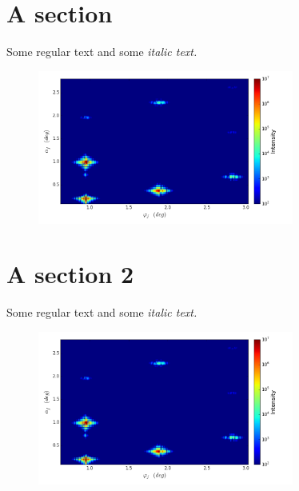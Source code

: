 \documentclass[landscape]{article}%
\begin{document}
%
\normalsize%
\section{A section}%
\label{sec:A section}%
Some regular text and some %
\textit{italic text. }%


\begin{figure}[h!]%
\centering%
\includegraphics[width=0.75\textwidth]{meso.png}%
\end{figure}

%
\newpage%
\section{A section 2}%
\label{sec:A section 2}%
Some regular text and some %
\textit{italic text. }%


\begin{figure}[h!]%
\centering%
\includegraphics[width=0.75\textwidth]{meso.png}%
\end{figure}
\end{document}
